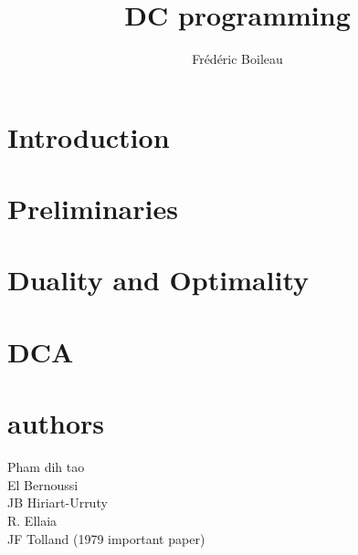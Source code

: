 
\newcommand{\citeauthorandyear}[2][]{
   \citeauthor{#2} (\citeyear[#1]{#2})
}
\newcommand{\argmin}{\mathrm{argmin}}
%
\title{DC programming}
\author{Frédéric Boileau}
\date{}
 
\pagestyle{fancy}	

\maketitle
\tableofcontents
\clearpage

\section{Introduction}

\clearpage
\section{Preliminaries}

\clearpage
\section{Duality and Optimality}

\section{DCA}

\clearpage

%


\appendix
\clearpage
\printbibliography
\clearpage
\section{authors}
Pham dih tao\\
El Bernoussi\\
JB Hiriart-Urruty\\
R. Ellaia\\
JF Tolland (1979 important paper)

